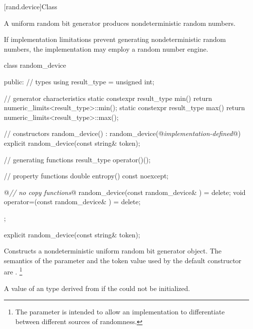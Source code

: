 

[rand.device]{Class }%
%

\pnum
A 
uniform random bit generator
produces nondeterministic random numbers.

\pnum
If implementation limitations%
prevent generating nondeterministic random numbers,
the implementation may employ a random number engine.

%
\begin{codeblock}
class random_device {
public:
  // types
  using result_type = unsigned int;

  // generator characteristics
  static constexpr result_type min() { return numeric_limits<result_type>::min(); }
  static constexpr result_type max() { return numeric_limits<result_type>::max(); }

  // constructors
  random_device() : random_device(@\textit{implementation-defined}@) {}
  explicit random_device(const string& token);

  // generating functions
  result_type operator()();

  // property functions
  double entropy() const noexcept;

  @\textit{// no copy functions}@
  random_device(const random_device& ) = delete;
  void operator=(const random_device& ) = delete;
};
\end{codeblock}


%
\begin{itemdecl}
explicit random_device(const string& token);
\end{itemdecl}

\begin{itemdescr}
\pnum\effects Constructs a 
 nondeterministic uniform random bit generator object.
 The semantics of the  parameter
 and the token value used by the default constructor are
 .%
\footnote{The parameter is intended
   to allow an implementation to differentiate
   between different sources of randomness.
 }

\pnum
\throws A value of an  type
 derived from 
 if the  could not be initialized.
\end{itemdescr}

